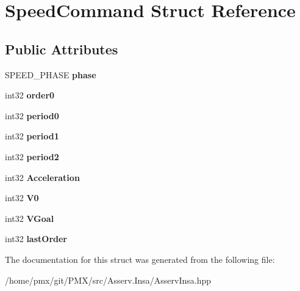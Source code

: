 \hypertarget{structSpeedCommand}{}\section{Speed\+Command Struct Reference}
\label{structSpeedCommand}
\subsection*{Public Attributes}
\begin{DoxyCompactItemize}
\item 
\mbox{\label{structSpeedCommand_af7c4ea03af0937182d506f06b85c5212}} 
S\+P\+E\+E\+D\+\_\+\+P\+H\+A\+SE {\bfseries phase}
\item 
\mbox{\label{structSpeedCommand_a76adf31d80ee8203564fd74d2e83c766}} 
int32 {\bfseries order0}
\item 
\mbox{\label{structSpeedCommand_a304895b166e384e95678b9f3cdfdf622}} 
int32 {\bfseries period0}
\item 
\mbox{\label{structSpeedCommand_aa9f994d08e73f47d57240dedfdb4067d}} 
int32 {\bfseries period1}
\item 
\mbox{\label{structSpeedCommand_ae1d3c3fb225051cfb1c06bd4353cdcbb}} 
int32 {\bfseries period2}
\item 
\mbox{\label{structSpeedCommand_a6c6ade4b5e68785dc418e332fe1848ee}} 
int32 {\bfseries Acceleration}
\item 
\mbox{\label{structSpeedCommand_aaced416e66072bb6621dafff22beb759}} 
int32 {\bfseries V0}
\item 
\mbox{\label{structSpeedCommand_a7e38b56e5c960a209db046a899147ed6}} 
int32 {\bfseries V\+Goal}
\item 
\mbox{\label{structSpeedCommand_a1cac13a04c3b2e0addd3b470a822d4d9}} 
int32 {\bfseries last\+Order}
\end{DoxyCompactItemize}


The documentation for this struct was generated from the following file\+:\begin{DoxyCompactItemize}
\item 
/home/pmx/git/\+P\+M\+X/src/\+Asserv.\+Insa/Asserv\+Insa.\+hpp\end{DoxyCompactItemize}
